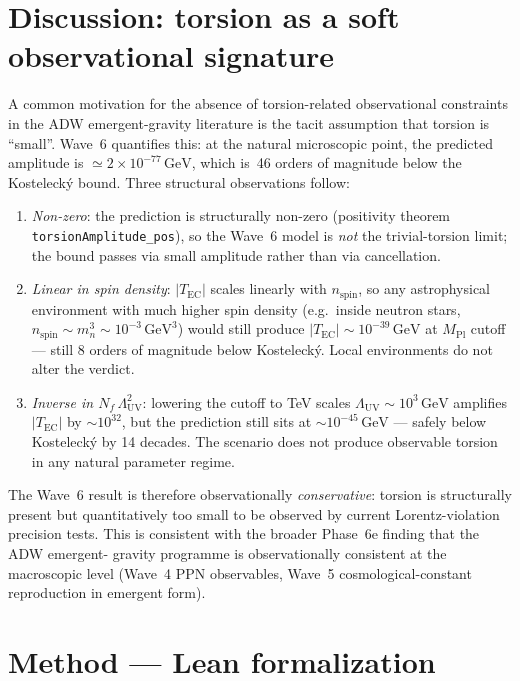 \documentclass[twocolumn]{revtex4-2}
\newcommand{\Nf}{N_f}
\newcommand{\LambdaUV}{\Lambda_{\mathrm{UV}}}
\newcommand{\MPl}{M_{\mathrm{Pl}}}
\newcommand{\TEC}{T_{\mathrm{EC}}}
\newcommand{\nspin}{n_{\mathrm{spin}}}
\begin{document}
\section{Discussion: torsion as a soft observational signature}

A common motivation for the absence of torsion-related observational
constraints in the ADW emergent-gravity literature is the tacit
assumption that torsion is ``small''. Wave~6 quantifies this: at
the natural microscopic point, the predicted amplitude is
$\simeq 2\times 10^{-77}\,\mathrm{GeV}$, which is~46 orders of
magnitude below the Kostelecký bound. Three structural observations
follow:

\begin{enumerate}
\item \emph{Non-zero}: the prediction is structurally non-zero
(positivity theorem
\texttt{torsionAmplitude\_pos}), so the Wave~6 model is
\emph{not} the trivial-torsion limit; the bound passes via small
amplitude rather than via cancellation.

\item \emph{Linear in spin density}: $|\TEC|$ scales linearly with
$\nspin$, so any astrophysical environment with much higher spin
density (e.g.\ inside neutron stars, $\nspin \sim m_{n}^{3} \sim
10^{-3}\,\mathrm{GeV}^{3}$) would still produce
$|\TEC| \sim 10^{-39}\,\mathrm{GeV}$ at $\MPl$ cutoff --- still
8 orders of magnitude below Kostelecký. Local environments do not
alter the verdict.

\item \emph{Inverse in $\Nf\,\LambdaUV^{2}$}: lowering the cutoff
to TeV scales $\LambdaUV \sim 10^{3}\,\mathrm{GeV}$ amplifies
$|\TEC|$ by $\sim 10^{32}$, but the prediction still sits at
$\sim 10^{-45}\,\mathrm{GeV}$ --- safely below Kostelecký by 14
decades. The scenario does not produce observable torsion in any
natural parameter regime.
\end{enumerate}

The Wave~6 result is therefore observationally \emph{conservative}:
torsion is structurally present but quantitatively too small to be
observed by current Lorentz-violation precision tests. This is
consistent with the broader Phase~6e finding that the ADW emergent-
gravity programme is observationally consistent at the macroscopic
level (Wave~4 PPN observables, Wave~5 cosmological-constant
reproduction in emergent form).

\section{Method --- Lean formalization}
\end{document}

